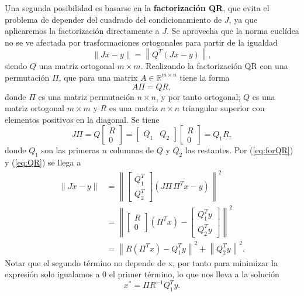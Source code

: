 \documentclass[11pt,a4paper]{book}
\theoremstyle{definition}
\theoremstyle{remark}
\newcommand{\norm}[1]{\left\lVert#1\right\rVert}
\begin{document}
Una segunda posibilidad es basarse en la \textbf{factorización QR}, que evita el problema de depender del cuadrado del condicionamiento de $J$, ya que aplicaremos la factorización directamente a $J$. Se aprovecha que la norma euclídea no se ve afectada por trasformaciones ortogonales para partir de la igualdad
\begin{equation}\label{eq:forQR}
	\norm{Jx- y} = \norm{Q^T(Jx-y)}, 
\end{equation}
siendo $Q$ una matriz ortogonal $m \times m$. Realizando la factorización QR
con una permutación $\Pi$, que
para una matrix $A \in \mathbb{R}^{m \times n}$ tiene la forma
\begin{equation}
	A\Pi = QR,
\end{equation}
donde $\Pi$ es una matriz permutación $n \times n$, y por tanto ortogonal; $Q$ es una matriz
ortogonal $m \times m$ y $R$ es una matriz $n \times n$ triangular superior con elementos positivos en la diagonal. Se tiene
\begin{equation}\label{eq:QR}
J\Pi = Q \left[ \begin{array}{c} R \\ 0 \end{array} \right] =
\left[ \begin{array}{cc} Q_1 & Q_2 \end{array} \right] \left[ \begin{array}{c} R \\ 0 \end{array} \right] = Q_1 R,
\end{equation}
donde $Q_1$ son las primeras $n$ columnas de $Q$ y $Q_2$ las restantes. Por
(\ref{eq:forQR}) y (\ref{eq:QR}) se llega a
\begin{equation}
\begin{split}
	\norm{Jx- y} &= \norm{
		\left[ \begin{array}{c} Q_1^T \\ Q_2^T \end{array} \right]
		(J\Pi\,\Pi^Tx-y)
		}^2 \\
	&= \norm{
		\left[ \begin{array}{c} R \\ 0 \end{array} \right]
		(\Pi^Tx)-\left[ \begin{array}{c} Q_1^Ty \\ Q_2^Ty \end{array} \right]
		}^2 \\
	&= \norm{R(\Pi^Tx)-Q_1^Ty}^2 + \norm{Q_2^Ty}^2.
\end{split}
\end{equation}
Notar que el segundo término no depende de x, por tanto para minimizar la expresión solo igualamos a 0 el primer término, lo que nos lleva a la solución
\begin{equation}
	x^* = \Pi R^{-1}Q_1^Ty.
\end{equation}
\end{document}
